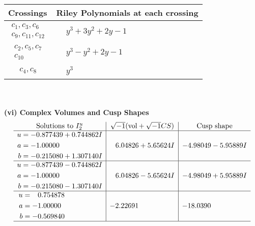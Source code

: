 \documentclass[1p]{elsarticle_modified}
\theoremstyle{definition}
\newcommand{\I}{\sqrt{-1}}
\begin{document}
\begin{tabular}{m{50pt}|m{274pt}}
Crossings & \hspace{64pt}Riley Polynomials at each crossing \\
\hline $$\begin{aligned}c_{1},c_{3},c_{6}\\c_{9},c_{11},c_{12}\end{aligned}$$&$\begin{aligned}
&y^3+3 y^2+2 y-1
\end{aligned}$\\
\hline $$\begin{aligned}c_{2},c_{5},c_{7}\\c_{10}\end{aligned}$$&$\begin{aligned}
&y^3- y^2+2 y-1
\end{aligned}$\\
\hline $$\begin{aligned}c_{4},c_{8}\end{aligned}$$&$\begin{aligned}
&y^3
\end{aligned}$\\
\hline
\end{tabular}\\~\\
\newpage\flushleft \textbf{(vi) Complex Volumes and Cusp Shapes}
$$\begin{array}{c|c|c}  
\text{Solutions to }I^u_{2}& \I (\text{vol} + \sqrt{-1}CS) & \text{Cusp shape}\\
 \hline 
\begin{aligned}
u &= -0.877439 + 0.744862 I \\
a &= -1.00000\phantom{ +0.000000I} \\
b &= -0.215080 + 1.307140 I\end{aligned}
 & \phantom{-}6.04826 + 5.65624 I & -4.98049 - 5.95889 I \\ \hline\begin{aligned}
u &= -0.877439 - 0.744862 I \\
a &= -1.00000\phantom{ +0.000000I} \\
b &= -0.215080 - 1.307140 I\end{aligned}
 & \phantom{-}6.04826 - 5.65624 I & -4.98049 + 5.95889 I \\ \hline\begin{aligned}
u &= \phantom{-}0.754878\phantom{ +0.000000I} \\
a &= -1.00000\phantom{ +0.000000I} \\
b &= -0.569840\phantom{ +0.000000I}\end{aligned}
 & -2.22691\phantom{ +0.000000I} & -18.0390\phantom{ +0.000000I}\\
 \hline 
 \end{array}$$\newpage\newpage\renewcommand{\arraystretch}{1}
\end{document}
